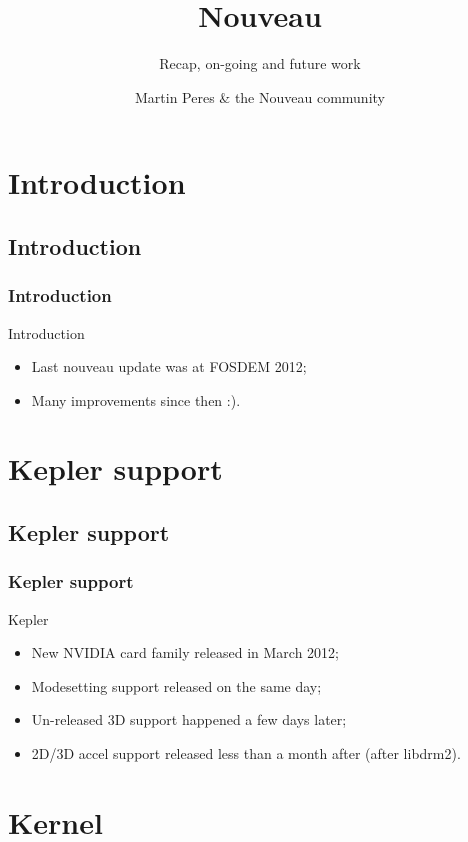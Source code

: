 \documentclass[11pt,english,compress]{beamer}
\title{Nouveau}
\subtitle{Recap, on-going and future work}
\author{Martin Peres \& the Nouveau community}
\institute{Ph.D. student at LaBRI}
\begin{document}

\begin{frame}
	\titlepage
\end{frame}

\section{Introduction}
\subsection*{Introduction}
\begin{frame}
	\frametitle{Introduction}

	\begin{block}{Introduction}
		\begin{itemize}
			\item Last nouveau update was at FOSDEM 2012;
			\item Many improvements since then :).
		\end{itemize}
	\end{block}
\end{frame}

\section{Kepler support}
\subsection*{Kepler support}
\begin{frame}
	\frametitle{Kepler support}

	\begin{block}{Kepler}
		\begin{itemize}
			\item New NVIDIA card family released in March 2012;
			\item Modesetting support released on the same day;
			\item Un-released 3D support happened a few days later;
			\item 2D/3D accel support released less than a month after (after libdrm2).
		\end{itemize}
	\end{block}
\end{frame}

\section{Kernel}
\end{document}
